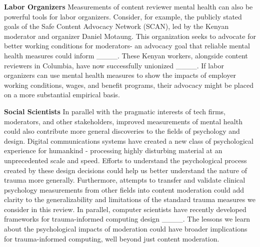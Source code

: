 \textbf{Labor Organizers}
Measurements of content reviewer mental health can also be powerful tools for labor organizers. Consider, for example, the publicly stated goals of the Safe Content Advocacy Network (SCAN), led by the Kenyan moderator and organizer Daniel Motaung. This organization seeks to advocate for better working conditions for moderators- an advocacy goal that reliable mental health measures could inform ____. These Kenyan workers, alongside content reviewers in Columbia, have now successfully unionized ____. If labor organizers can use mental health measures to show the impacts of employer working conditions, wages, and benefit programs, their advocacy might be placed on a more substantial empirical basis.

\textbf{Social Scientists}
In parallel with the pragmatic interests of tech firms, moderators, and other stakeholders, improved measurements of mental health could also contribute more general discoveries to the fields of psychology and design. Digital communications systems have created a new class of psychological experience for humankind - processing highly disturbing material at an unprecedented scale and speed. Efforts to understand the psychological process created by these design decisions could help us better understand the nature of trauma more generally. Furthermore, attempts to transfer and validate clinical psychology measurements from other fields into content moderation could add clarity to the generalizability and limitations of the standard trauma measures we consider in this review. In parallel, computer scientists have recently developed frameworks for trauma-informed computing design ____. The lessons we learn about the psychological impacts of moderation could have broader implications for trauma-informed computing, well beyond just content moderation.